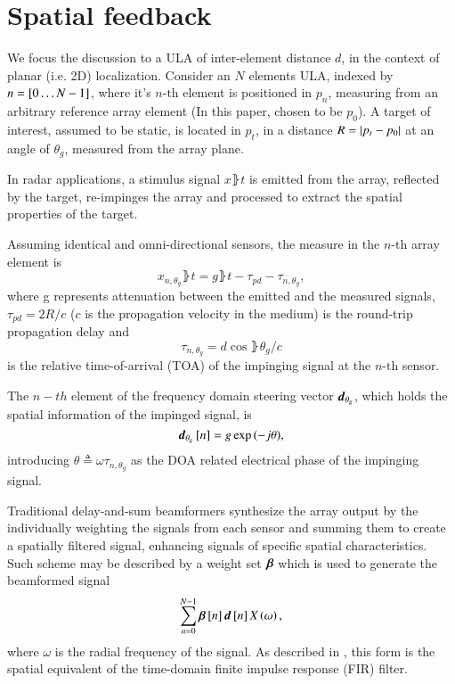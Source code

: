 \documentclass[conference]{IEEEtran}
\begin{document}
\section{Spatial feedback}\label{sec_spatialFeedback}
We focus the discussion to a ULA of inter-element distance $d$, in the context of planar (i.e. 2D) localization. Consider an $N$ elements ULA, indexed by $n=\left[{0\hdots{}N-1}\right]$, where it's $n\text{-th}$ element is positioned in $p_{n}$, measuring from an arbitrary reference array element (In this paper, chosen to be $p_{0}$). A target of interest, assumed to be static, is located in $p_{t}$, in a distance $R=\left\vert p_{t}-p_{0}\right\vert$ at an angle of $\theta_{g}$, measured from the array plane.
\par In radar applications, a stimulus signal $x\rBrace{t}$ is emitted from the array, reflected by the target, re-impinges the array and processed to extract the spatial properties of the target. 
\par Assuming identical and omni-directional sensors, the measure in the $n\text{-th}$ array element is
\begin{equation}\label{eq_ULA_nth_measure}
x_{n,\theta_{g}}\rBrace{t}= g\rBrace{t-\tau_{pd}-\tau_{n,\theta_{g}}},
\end{equation}
where g represents attenuation between the emitted and the measured signals, $\tau_{pd}=2R/c$ ($c$ is the propagation velocity in the medium) is the round-trip propagation delay and $$\tau_{n,\theta_{g}}=d\cos{\rBrace{\theta_{g}}}/c$$ is the relative time-of-arrival (TOA) of the impinging signal at the $n\text{-th}$ sensor.
\par The $n-th$ element of the frequency domain steering vector $\boldsymbol{d}_{\theta_{g}}$, which holds the spatial information of the impinged signal, is
\begin{equation}
    \boldsymbol{d}_{\theta_{g}}\left[{n}\right]=g\exp{\left({-j\theta}\right)},
\end{equation}
introducing $\theta\triangleq\omega\tau_{n,\theta_{g}}$ as the DOA related electrical phase of the impinging signal. 
\par Traditional delay-and-sum beamformers synthesize the array output by the individually weighting the signals from each sensor and summing them to create a spatially filtered signal, enhancing signals of specific spatial characteristics. Such scheme may be described by a weight set $\boldsymbol{\beta}$ which is used to generate the beamformed signal $$\sum^{N-1}_{n=0}\vBeta\vBrace{n}\vd\vBrace{n}\F{x}\rBrace{\omega},$$ where $\omega$ is the radial frequency of the signal. As described in \cite{bbb}, this form is the spatial equivalent of the time-domain finite impulse response (FIR) filter.
\end{document}

